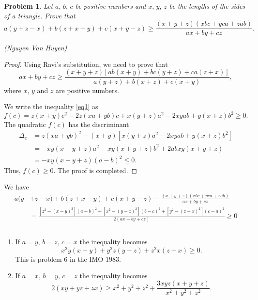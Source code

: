 \documentclass[12pt,a4paper]{book}
\theoremstyle{plain}
\newtheorem*{pro}{\cmss\problemColor Problem}
\begin{document}
\begin{pro}
Let $a,\,b,\,c$ be positive numbers and $x,\,y,\,z$  be the lengths of the sides of a triangle. Prove that
\[a(y+z-x)+b(z+x-y)+c(x+y-z) \geq \frac{(x+y+z)(xbc+yca+zab)}{ax+by+cz}.\]
\begin{flushright}(Nguyen Van Huyen)\end{flushright}
\end{pro}

\begin{proof}
Using Ravi's substitution, we need to prove that
\begin{equation}\label{eq1}
ax+by+cz\geq\frac{(x+y+z)[ab(x+y)+bc(y+z)+ca(z+x)]}{a(y+z)+b(x+z)+c(x+y)},
\end{equation}
where $x$, $y$ and $z$ are positive numbers.

We write the inequality \eqref{eq1} as
$$f(c) = z(x+y)c^2-2z(xa+yb)c+x(y+z)a^2-2xyab+y(x+z)b^2 \geq 0.$$
The quadratic $f(c)$ has the discriminant
\[\begin{aligned}
\Delta_c &= z(xa+yb)^2-(x+y)[x(y+z)a^2-2xyab+y(x+z)b^2] \\&
= - xy(x+y+z)a^2 - xy(x+y+z)b^2 + 2abxy(x+y+z) \\&
= - xy(x+y+z)(a-b)^2 \leqslant 0.
\end{aligned}\]
Thus, $f(c) \ge 0.$ The proof is completed.
\end{proof}

\begin{remark}
We have
\[\begin{aligned}
a(y&+z-x)+b(z+x-y)+c(x+y-z) - \frac{(x+y+z)(xbc+yca+zab)}{ax+by+cz} \\&
=\frac{[z^2-(x-y)^2](a-b)^2+[x^2-(y-z)^2](b-c)^2+[y^2-(z-x)^2](c-a)^2}{2(ax+by+cz)} \ge 0
\end{aligned}\]
\end{remark}

\begin{remark} $\,$
\begin{enumerate}[(1)]
\item If $a=y,\,b=z,\,c=x$ the inequality becomes
\[x^2y(x-y) + y^2z(y-z) + z^2x(z-x) \ge 0.\]
This is problem $6$ in the IMO $1983.$
\item If $a=x,\,b=y,\,c=z$ the inequality becomes
\[2(xy+yz+zx) \geqslant x^2+y^2+z^2+\frac{3xyz(x+y+z)}{x^2+y^2+z^2}.\]
\end{enumerate}
\end{remark}
\end{document}
